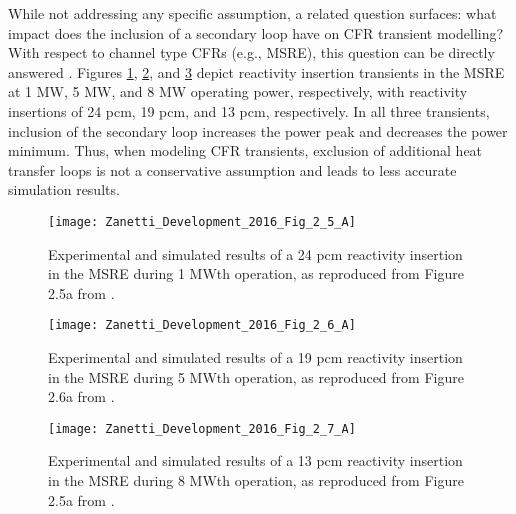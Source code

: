 \documentclass[review]{elsarticle}
\begin{document}
\par While not addressing any specific assumption, a related question surfaces:
what impact does the inclusion of a secondary loop
have on CFR transient modelling? With respect to channel type CFRs
(e.g., MSRE), this question can be directly answered 
\cite{zanetti_development_2016}. Figures \ref{fig:zanetti_sec_1mw},
\ref{fig:zanetti_sec_5mw}, and \ref{fig:zanetti_sec_8mw} 
depict reactivity insertion
transients in the MSRE at 1 MW, 5 MW, and 8 MW operating power, respectively,
with reactivity insertions of 24 pcm, 19 pcm, and 13 pcm,
respectively. In all three transients, inclusion of the secondary loop
increases the power peak and decreases the power minimum. Thus,
when modeling CFR transients, exclusion of additional heat transfer
loops is not a conservative assumption and leads to less accurate simulation
results.

\begin{figure}[H]
   \centering
   \texttt{[image: Zanetti\_Development\_2016\_Fig\_2\_5\_A]}
   \caption{Experimental and
   simulated results of a 24 pcm reactivity insertion in the MSRE during
    1 MWth operation, as reproduced from Figure 2.5a from \cite{zanetti_development_2016}.} 
   \label{fig:zanetti_sec_1mw}
\end{figure}

\begin{figure}[H]
   \centering
   \texttt{[image: Zanetti\_Development\_2016\_Fig\_2\_6\_A]}
   \caption{Experimental and
   simulated results of a 19 pcm reactivity insertion in the MSRE during 5 MWth operation, as reproduced from Figure 2.6a from \cite{zanetti_development_2016}.} 
   \label{fig:zanetti_sec_5mw}
\end{figure}

\begin{figure}[H]
   \centering
   \texttt{[image: Zanetti\_Development\_2016\_Fig\_2\_7\_A]}
   \caption{Experimental and simulated
   results of a 13 pcm reactivity insertion in the MSRE during 8 MWth operation, as reproduced from Figure 2.5a from \cite{zanetti_development_2016}.} 
   \label{fig:zanetti_sec_8mw}
\end{figure}
\end{document}
